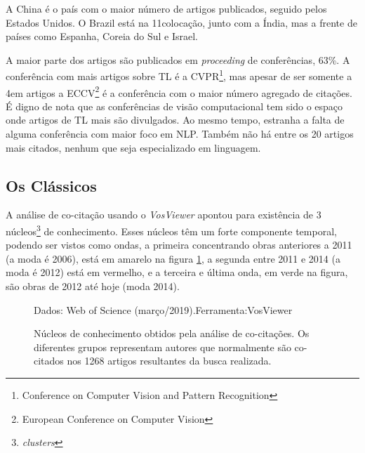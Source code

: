 \documentclass[sigconf]{acmart}
\newcommand{\source}[2]{\raggedleft{}\vspace*{-7mm}\caption*{ \textmd{\scriptsize{Dados: {#1}.\hfill Ferramenta:{#2}}}}}
\begin{document}
  A China é o país com o maior número de artigos publicados, seguido pelos Estados Unidos. O Brazil está na 11\textordfeminine colocação, junto com a Índia, mas a frente de países como Espanha, Coreia do Sul e Israel.

  A maior parte dos artigos são publicados em \emph{proceeding} de conferências, 63\%. A conferência com mais artigos sobre TL é a CVPR\footnote{Conference on Computer Vision and Pattern Recognition}, mas apesar de ser somente a 4\textordfeminine em artigos a ECCV\footnote{European Conference on Computer Vision} é a conferência com o maior número agregado de citações. É digno de nota que as conferências de visão computacional tem sido o espaço onde artigos de TL mais são divulgados. Ao mesmo tempo, estranha a falta de alguma conferência com maior foco em NLP. Também não há entre os 20 artigos mais citados, nenhum que seja especializado em linguagem.
  \subsection{Os Clássicos}\label{classicos}
A análise de co-citação usando o \emph{VosViewer} apontou para existência de 3 núcleos\footnote{\emph{clusters}} de conhecimento. Esses núcleos têm um forte componente temporal, podendo ser vistos como ondas, a primeira concentrando obras anteriores a 2011 (a moda é 2006),  está em amarelo na figura \ref{fig:classicos}, a segunda entre 2011 e 2014 (a moda é 2012) está em vermelho, e a terceira e última onda, em verde na figura, são obras de 2012 até hoje (moda 2014).
\begin{figure}[htp]
  \source{Web of Science (março/2019)}{VosViewer\protect{~\cite{VOSviewer}}}
  \caption{Núcleos de conhecimento obtidos pela análise de co-citações. Os diferentes grupos representam autores que normalmente são co-citados nos 1268 artigos resultantes da busca realizada.}
  \label{fig:classicos}
\end{figure}
\end{document}
